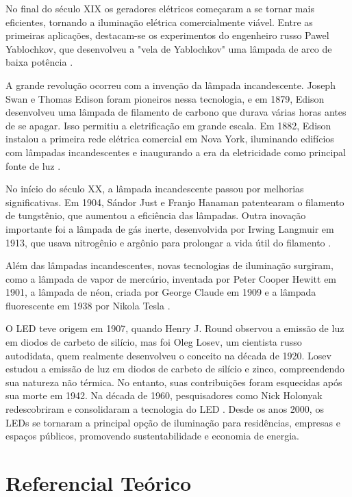 No final do século XIX os geradores elétricos começaram a se tornar mais eficientes, tornando a iluminação elétrica comercialmente viável. Entre as primeiras aplicações, destacam-se os experimentos do engenheiro russo Pawel Yablochkov, que desenvolveu a "vela de Yablochkov" uma lâmpada de arco de baixa potência \cite{Dredge2014}. 

A grande revolução ocorreu com a invenção da lâmpada incandescente. Joseph Swan e Thomas Edison foram pioneiros nessa tecnologia, e em 1879, Edison desenvolveu uma lâmpada de filamento de carbono que durava várias horas antes de se apagar. Isso permitiu a eletrificação em grande escala. Em 1882, Edison instalou a primeira rede elétrica comercial em Nova York, iluminando edifícios com lâmpadas incandescentes e inaugurando a era da eletricidade como principal fonte de luz \cite{Dredge2014}.

No início do século XX, a lâmpada incandescente passou por melhorias significativas. Em 1904, Sándor Just e Franjo Hanaman patentearam o filamento de tungstênio, que aumentou a eficiência das lâmpadas. Outra inovação importante foi a lâmpada de gás inerte, desenvolvida por Irwing Langmuir em 1913, que usava nitrogênio e argônio para prolongar a vida útil do filamento \cite{Bright1949}.

Além das lâmpadas incandescentes, novas tecnologias de iluminação surgiram, como a lâmpada de vapor de mercúrio, inventada por Peter Cooper Hewitt em 1901, a lâmpada de néon, criada por George Claude em 1909 e a lâmpada fluorescente em 1938 por Nikola Tesla \cite{Bright1949}.

O LED teve origem em 1907, quando Henry J. Round observou a emissão de luz em diodos de carbeto de silício, mas foi Oleg Losev, um cientista russo autodidata, quem realmente desenvolveu o conceito na década de 1920. Losev estudou a emissão de luz em diodos de carbeto de silício e zinco, compreendendo sua natureza não térmica. No entanto, suas contribuições foram esquecidas após sua morte em 1942. Na década de 1960, pesquisadores como Nick Holonyak redescobriram e consolidaram a tecnologia do LED \cite{Zheludev2007}. Desde os anos 2000, os LEDs se tornaram a principal opção de iluminação para residências, empresas e espaços públicos, promovendo sustentabilidade e economia de energia.



\chapter{Referencial Teórico}



